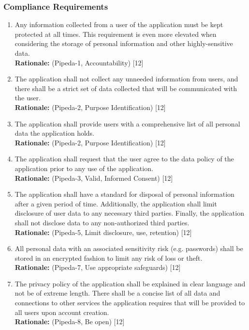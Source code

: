 \documentclass[]{article}
\begin{document}
\subsubsection{Compliance Requirements}
\label{ssub:compliance_requirements}
\begin{enumerate}[{LR-COMP}1. ]
	\item Any information collected from a user of the application must be kept protected at all times. This requirement is even more elevated when considering the storage of personal information and other highly-sensitive data. \\
    \textbf{Rationale:} (Pipeda-1, Accountability) [12]
	\item The application shall not collect any unneeded information from users, and there shall be a strict set of data collected that will be communicated with the user. \\
    \textbf{Rationale:} (Pipeda-2, Purpose Identification) [12]
	\item The application shall provide users with a comprehensive list of all personal data the application holds. \\\textbf{Rationale:}  (Pipeda-2, Purpose Identification) [12]
	\item The application shall request that the user agree to the data policy of the application prior to any use of the application.\\
    \textbf{Rationale:} (Pipeda-3, Valid, Informed Consent) [12]
	\item The application shall have a standard for disposal of personal information after a given period of time. Additionally, the application shall limit disclosure of user data to any necessary third parties. Finally, the application shall not disclose data to any non-authorized third parties. \\
    \textbf{Rationale:} (Pipeda-5, Limit disclosure, use, retention) [12]
	\item All personal data with an associated sensitivity risk (e.g. passwords) shall be stored in an encrypted fashion to limit any risk of loss or theft.\\
    \textbf{Rationale:}  (Pipeda-7, Use appropriate safeguards) [12]
	\item  The privacy policy of the application shall be explained in clear language and not be of extreme length. There shall be a concise list of all data and connections to other services the application requires that will be provided to all users upon account creation. \\
    \textbf{Rationale:}  (Pipeda-8, Be open) [12]
\end{enumerate}
\end{document}
